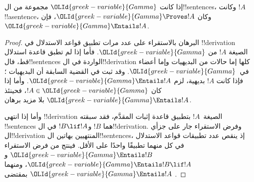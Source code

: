 \documentclass[../../../include/open-logic-section]{subfiles}
\begin{document}
\begin{thm}[السلامة]
إذا كانت $\OLId{greek-variable}{Gamma}$ مجموعة من ال!!{sentence}s، وكانت $!A$ !!a{sentence}،
وكان $\OLId{greek-variable}{Gamma} \Proves !A$، فإن $\OLId{greek-variable}{Gamma} \Entails !A$.
\end{thm}

\begin{proof}
البرهان بالاستقراء على عدد مرات تطبيق قواعد الاستدلال في !!{derivation}
الصيغة $!A$ من $\OLId{greek-variable}{Gamma}$. فأما إذا لم تطبق قاعدة استدلال قط، فال!!{sentence}s
الواردة في ال!!{derivation} كلها إما حالات من البديهيات وإما أعضاء
في~$\OLId{greek-variable}{Gamma}$. وقد ثبت في القضية السابقة أن البديهيات
؛ فإذا كانت $!A$ بديهية، لزم
$\OLId{greek-variable}{Gamma} \Entails !A$. وأما إذا كان $!A \in \OLId{greek-variable}{Gamma}$، فحينئذ
$\OLId{greek-variable}{Gamma} \Entails !A$ بلا مزيد برهان.

وأما إذا انتهى !!{derivation} الصيغة~$!A$ بتطبيق قاعدة إثبات المقدَّم،
فقد سبقته !!{sentence}s هما $!B$ و$!B \lif !A$ في
ال!!{derivation}. وفرض الاستقراء جار على جزأي ال!!{derivation}
المنتهيين بهاتين ال!!{sentence}s، إذ ينقص عدد تطبيقات قواعد الاستدلال
في كل منهما تطبيقًا واحدًا على الأقل. فينتج من فرض الاستقراء
$\OLId{greek-variable}{Gamma} \Entails !B$ و$\OLId{greek-variable}{Gamma} \Entails !B \lif !A$، ومنهما
$\OLId{greek-variable}{Gamma} \Entails !A$ بمقتضى
      {}
      {}.

\end{proof}
\end{document}
